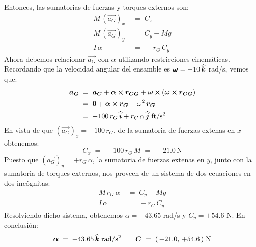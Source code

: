 \documentclass[ a4paper, twoside, 11pt]{article}
\begin{document}
\begin{problem}
Entonces, las sumatorias de fuerzas y torques externos son: 
\begin{align*}
M \, (\vec{a_G})_x \; & = \; C_x \\
M \, (\vec{a_G})_y \; & = \; C_y - M g \\
I \, \alpha \; & = \; -r_G \, C_y
\end{align*}
Ahora debemos relacionar $\vec{a_G}$ con $\alpha$ utilizando restricciones cinem\'aticas. Recordando que la velocidad angular del ensamble es ${\boldsymbol{\omega}} = -10 \, {\boldsymbol{\widehat{k}}}$ rad/s, vemos que: 
\begin{align*}
{\boldsymbol{a_G}} \; & = \;
{\boldsymbol{a_C}} + {\boldsymbol{\alpha}} \,{\boldsymbol{\times}}\, {\boldsymbol{r_{CG}}} + 
{\boldsymbol{\omega}} \,{\boldsymbol{\times}}\, ( {\boldsymbol{\omega}} \,{\boldsymbol{\times}}\, {\boldsymbol{r_{CG}}} ) \\
\; & = \;
{\boldsymbol{0}} + {\boldsymbol{\alpha}} \,{\boldsymbol{\times}}\, {\boldsymbol{r_{G}}} - \omega^2 \, {\boldsymbol{r_G}} \\
\; & = \; -100 \, r_G \, {\boldsymbol{\widehat{i}}} + r_G \, \alpha \, {\boldsymbol{\widehat{j}}} \; \text{ft/s\ensuremath{^{\text{2}}}}
\end{align*}
En vista de que $(\vec{a_G})_x = -100 \, r_G$, de la sumatoria de fuerzas extenas en $x$ obtenemos: 
\[
C_x \; = \; -100 \, r_G \, M \; = \; -21.0 \, \text{N}
\]
Puesto que $(\vec{a_G})_y = +r_G \, \alpha$, la sumatoria de fuerzas extenas en $y$, junto con la sumatoria de torques externos, nos proveen de un sistema de dos ecuaciones en dos inc\'ognitas: 
\begin{align*}
M \, r_G \, \alpha \; & = \; C_y - M g \\
I \, \alpha \; & = \; -r_G \, C_y
\end{align*}
Resolviendo dicho sistema, obtenemos $\alpha = -43.65$ rad/s y $C_y = +54.6$ N. En conclusi\'on: 
\[
{\boldsymbol{\alpha}} \; = \; -43.65 \, {\boldsymbol{\widehat{k}}} \; \text{rad/s\ensuremath{^{\text{2}}}} \qquad
{\boldsymbol{C}} \; = \; ( \, -21.0, \, +54.6 \, ) \; \text{N}
\]


\end{problem}
\fullskip
\end{document}
